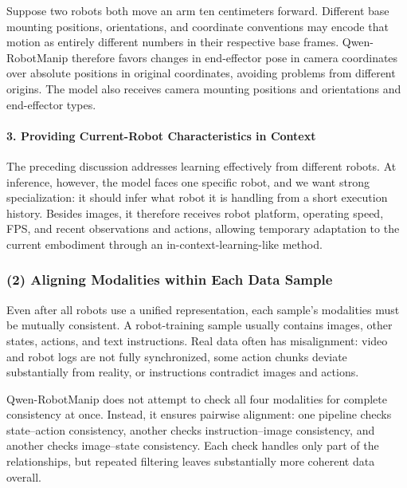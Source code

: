 Suppose two robots both move an arm ten centimeters forward. Different base mounting positions, orientations, and coordinate conventions may encode that motion as entirely different numbers in their respective base frames. Qwen-RobotManip therefore favors changes in end-effector pose in camera coordinates over absolute positions in original coordinates, avoiding problems from different origins. The model also receives camera mounting positions and orientations and end-effector types.

\hypertarget{providing-current-robot-characteristics-in-context}{%
\paragraph{3. Providing Current-Robot Characteristics in Context}\label{providing-current-robot-characteristics-in-context}}

The preceding discussion addresses learning effectively from different robots. At inference, however, the model faces one specific robot, and we want strong specialization: it should infer what robot it is handling from a short execution history. Besides images, it therefore receives robot platform, operating speed, FPS, and recent observations and actions, allowing temporary adaptation to the current embodiment through an in-context-learning-like method.

\hypertarget{aligning-modalities-within-each-data-sample}{%
\subsubsection{(2) Aligning Modalities within Each Data Sample}\label{aligning-modalities-within-each-data-sample}}

Even after all robots use a unified representation, each sample's modalities must be mutually consistent. A robot-training sample usually contains images, other states, actions, and text instructions. Real data often has misalignment: video and robot logs are not fully synchronized, some action chunks deviate substantially from reality, or instructions contradict images and actions.

Qwen-RobotManip does not attempt to check all four modalities for complete consistency at once. Instead, it ensures pairwise alignment: one pipeline checks state--action consistency, another checks instruction--image consistency, and another checks image--state consistency. Each check handles only part of the relationships, but repeated filtering leaves substantially more coherent data overall.

